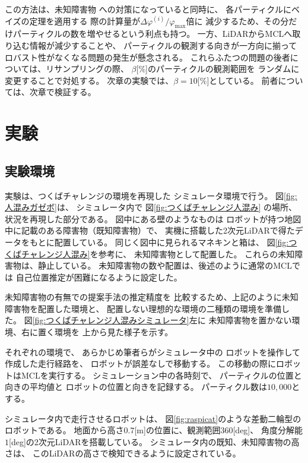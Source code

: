 \documentclass{jarticle}
\begin{document}
この方法は、未知障害物
への対策になっていると同時に、
各パーティクルにベイズの定理を適用する
際の計算量が$\Delta\varphi^{(i)}/\varphi_\text{max}$倍に
減少するため、その分だけパーティクルの数を増やせるという利点も持つ。
一方、LiDARからMCLへ取り込む情報が減少することや、
パーティクルの観測する向きが一方向に揃って
ロバスト性がなくなる問題の発生が懸念される。
これらふたつの問題の後者については、リサンプリングの際、
$\beta$[\%]のパーティクルの観測範囲を
ランダムに変更することで対処する。
次章の実験では、$\beta=10$[\%]としている。
前者については、次章で検証する。

\section{実験}%

\subsection{実験環境}

実験は、つくばチャレンジの環境を再現した
シミュレータ環境で行う。
図\ref{fig:人混みガゼボ}は、
シミュレータ内で
図\ref{fig:つくばチャレンジ人混み}
の場所、状況を再現した部分である。
図中にある壁のようなものは
ロボットが持つ地図中に記載のある障害物（既知障害物）で、
実機に搭載した2次元LiDARで得たデータをもとに配置している。
同じく図中に見られるマネキンと箱は、
図\ref{fig:つくばチャレンジ人混み}を参考に、
未知障害物として配置した。
これらの未知障害物は、静止している。
未知障害物の数や配置は、後述のように通常のMCLでは
自己位置推定が困難になるように設定した。

未知障害物の有無での提案手法の推定精度を
比較するため、上記のように未知障害物を配置した環境と、
配置しない理想的な環境の二種類の環境を準備した。
図\ref{fig:つくばチャレンジ人混みシミュレータ}左に
未知障害物を置かない環境、右に置く環境を
上から見た様子を示す。




それぞれの環境で、
あらかじめ筆者らがシミュレータ中の
ロボットを操作して作成した走行経路を、
ロボットが誤差なしで移動する。
この移動の際にロボットはMCLを実行する。
シミュレーション中の各時刻で、
パーティクルの位置と向きの平均値と
ロボットの位置と向きを記録する。
パーティクル数は$10,000$とする。

シミュレータ内で走行させるロボットは、
図\ref{fig:raspicat}のような差動二輪型のロボットである。
地面から高さ$0.7$[m]の位置に、観測範囲$360$[deg]、
角度分解能$1$[deg]の2次元LiDARを搭載している。
シミュレータ内の既知、未知障害物の高さは、
このLiDARの高さで検知できるように設定されている。
\end{document}
